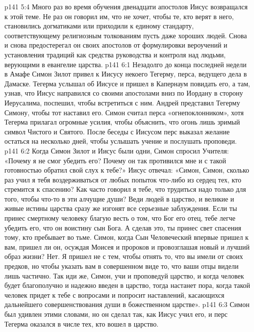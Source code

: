 \vs p141 5:4 Много раз во время обучения двенадцати апостолов Иисус возвращался к этой теме. Не раз он говорил им, что не хочет, чтобы те, кто верят в него, становились догматиками или приходили к единому стандарту, соответствующему религиозным толкованиям пусть даже хороших людей. Снова и снова предостерегал он своих апостолов от формулировки вероучений и установления традиций как средства руководства и контроля над людьми, верующими в евангелие царства.
\vs p141 6:1 Незадолго до конца последней недели в Амафе Симон Зилот привел к Иисусу некоего Тегерму, перса, ведущего дела в Дамаске. Тегерма услышал об Иисусе и пришел в Капернаум повидать его, а там, узнав, что Иисус направился со своими апостолами вниз по Иордану в сторону Иерусалима, поспешил, чтобы встретиться с ним. Андрей представил Тегерму Симону, чтобы тот наставил его. Симон считал перса «огнепоклонником», хотя Тегерма прилагал огромные усилия, чтобы объяснить, что огонь лишь зримый символ Чистого и Святого. После беседы с Иисусом перс выказал желание остаться на несколько дней, чтобы услышать учение и послушать проповеди.
\vs p141 6:2 Когда Симон Зилот и Иисус были одни, Симон спросил Учителя: «Почему я не смог убедить его? Почему он так противился мне и с такой готовностью обратил свой слух к тебе?» Иисус отвечал: «Симон, Симон, сколько раз учил я тебя воздерживаться от любых попыток  что\hyp{}либо из сердец тех, кто стремится к спасению? Как часто говорил я тебе, что трудиться надо только для того, чтобы  что\hyp{}то в эти алчущие души? Веди людей в царство, и великие и живые истины царства сразу же изгонят все серьезные заблуждения. Если ты принес смертному человеку благую весть о том, что Бог его отец, тебе легче убедить его, что он воистину сын Бога. А сделав это, ты принес свет спасения тому, кто пребывает во тьме. Симон, когда Сын Человеческий впервые пришел к вам, пришел ли он, осуждая Моисея и пророков и провозглашая новый и лучший образ жизни? Нет. Я пришел не с тем, чтобы отнять то, что вы имели от своих предков, но чтобы указать вам в совершенном виде то, что ваши отцы видели лишь частично. Так иди же, Симон, учи и проповедуй царство, и когда человек будет благополучно и надежно введен в царство, тогда настанет пора, когда такой человек придет к тебе с вопросами и попросит наставлений, касающихся дальнейшего совершенствования души в божественном царстве».
\vs p141 6:3 Симон был удивлен этими словами, но он сделал так, как Иисус учил его, и перс Тегерма оказался в числе тех, кто вошел в царство.
